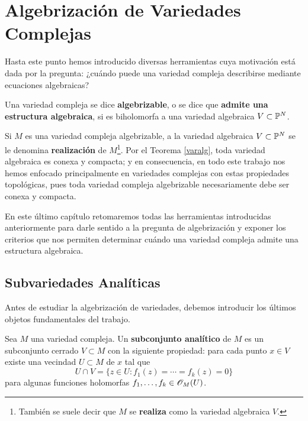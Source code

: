 \chapter{Algebrización de Variedades Complejas}

	Hasta este punto hemos introducido diversas herramientas cuya motivación está dada por la pregunta: ¿cuándo puede una variedad compleja describirse mediante ecuaciones algebraicas?
	
	\begin{definition}
		Una variedad compleja se dice \textbf{algebrizable}, o se dice que \textbf{admite una estructura algebraica}, si es biholomorfa a una variedad algebraica $V\subset \mathbb{P}^N$.
	\end{definition}
	
	Si $M$ es una variedad compleja algebrizable, a la variedad algebraica $V\subset \mathbb{P}^N$ se le denomina \textbf{realización} de $M$\footnote{También se suele decir que $M$ se \textbf{realiza} como la variedad algebraica $V$.}. Por el Teorema \ref{varalg}, toda variedad algebraica es conexa y compacta; y en consecuencia, en todo este trabajo nos hemos enfocado principalmente en variedades complejas con estas propiedades topológicas, pues toda variedad compleja algebrizable necesariamente debe ser conexa y compacta.
	
	En este último capítulo retomaremos todas las herramientas introducidas anteriormente para darle sentido a la pregunta de algebrización y exponer los criterios que nos permiten determinar cuándo una variedad compleja admite una estructura algebraica.

    \section{Subvariedades Analíticas}
    
    Antes de estudiar la algebrización de variedades, debemos introducir los últimos objetos fundamentales del trabajo.
    
    \begin{definition}
    	Sea $M$ una variedad compleja. Un \textbf{subconjunto analítico} de $M$ es un subconjunto cerrado $V\subset M$ con la siguiente propiedad: para cada punto $x\in V$ existe una vecindad $U\subset M$ de $x$ tal que
    	\begin{equation*}
    		U\cap V=\{z\in U:f_1(z)=\cdots=f_k(z)=0\}
    	\end{equation*}  
    	para algunas funciones holomorfas $f_1,\dots,f_k\in\mathscr{O}_M(U)$.
    \end{definition}
    
